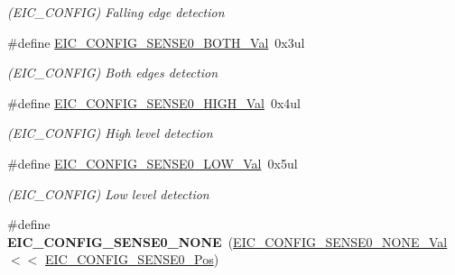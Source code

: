 \begin{DoxyCompactItemize}
\begin{DoxyCompactList}\small\item\em (E\+I\+C\+\_\+\+C\+O\+N\+F\+I\+G) Falling edge detection \end{DoxyCompactList}\item 
\hypertarget{group___s_a_m_l21___e_i_c_gac0808674223b5a4fe5e7d1e24c1499a3}{}\#define \hyperlink{group___s_a_m_l21___e_i_c_gac0808674223b5a4fe5e7d1e24c1499a3}{E\+I\+C\+\_\+\+C\+O\+N\+F\+I\+G\+\_\+\+S\+E\+N\+S\+E0\+\_\+\+B\+O\+T\+H\+\_\+\+Val}~0x3ul\label{group___s_a_m_l21___e_i_c_gac0808674223b5a4fe5e7d1e24c1499a3}

\begin{DoxyCompactList}\small\item\em (E\+I\+C\+\_\+\+C\+O\+N\+F\+I\+G) Both edges detection \end{DoxyCompactList}\item 
\hypertarget{group___s_a_m_l21___e_i_c_gadd8658a97c85968dea3f8bdcceabca94}{}\#define \hyperlink{group___s_a_m_l21___e_i_c_gadd8658a97c85968dea3f8bdcceabca94}{E\+I\+C\+\_\+\+C\+O\+N\+F\+I\+G\+\_\+\+S\+E\+N\+S\+E0\+\_\+\+H\+I\+G\+H\+\_\+\+Val}~0x4ul\label{group___s_a_m_l21___e_i_c_gadd8658a97c85968dea3f8bdcceabca94}

\begin{DoxyCompactList}\small\item\em (E\+I\+C\+\_\+\+C\+O\+N\+F\+I\+G) High level detection \end{DoxyCompactList}\item 
\hypertarget{group___s_a_m_l21___e_i_c_gad578c3896d5b3cdc4631cba1a6f3f8e2}{}\#define \hyperlink{group___s_a_m_l21___e_i_c_gad578c3896d5b3cdc4631cba1a6f3f8e2}{E\+I\+C\+\_\+\+C\+O\+N\+F\+I\+G\+\_\+\+S\+E\+N\+S\+E0\+\_\+\+L\+O\+W\+\_\+\+Val}~0x5ul\label{group___s_a_m_l21___e_i_c_gad578c3896d5b3cdc4631cba1a6f3f8e2}

\begin{DoxyCompactList}\small\item\em (E\+I\+C\+\_\+\+C\+O\+N\+F\+I\+G) Low level detection \end{DoxyCompactList}\item 
\hypertarget{group___s_a_m_l21___e_i_c_ga378c783f77963e228dac8f9a6a370e6f}{}\#define {\bfseries E\+I\+C\+\_\+\+C\+O\+N\+F\+I\+G\+\_\+\+S\+E\+N\+S\+E0\+\_\+\+N\+O\+N\+E}~(\hyperlink{group___s_a_m_l21___e_i_c_ga986d4e3fc22b167f6eb21a178ff4c45e}{E\+I\+C\+\_\+\+C\+O\+N\+F\+I\+G\+\_\+\+S\+E\+N\+S\+E0\+\_\+\+N\+O\+N\+E\+\_\+\+Val}    $<$$<$ \hyperlink{group___s_a_m_l21___e_i_c_ga9a191a13be42b2e0283c890d9302f461}{E\+I\+C\+\_\+\+C\+O\+N\+F\+I\+G\+\_\+\+S\+E\+N\+S\+E0\+\_\+\+Pos})\label{group___s_a_m_l21___e_i_c_ga378c783f77963e228dac8f9a6a370e6f}


\end{DoxyCompactItemize}
